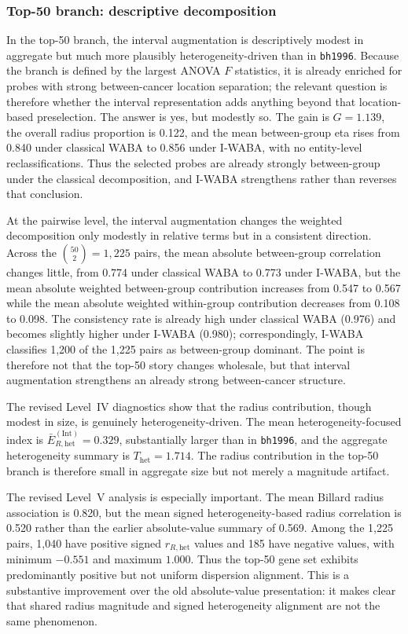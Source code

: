 \documentclass[preprint, times, 12pt, authoryear]{elsarticle}
\begin{document}
\subsubsection{Top-50 branch: descriptive decomposition}

In the top-50 branch, the interval augmentation is descriptively modest in aggregate but much more plausibly heterogeneity-driven than in \texttt{bh1996}. Because the branch is defined by the largest ANOVA $F$ statistics, it is already enriched for probes with strong between-cancer location separation; the relevant question is therefore whether the interval representation adds anything beyond that location-based preselection. The answer is yes, but modestly so. The gain is $G=1.139$, the overall radius proportion is 0.122, and the mean between-group eta rises from 0.840 under classical WABA to 0.856 under I-WABA, with no entity-level reclassifications. Thus the selected probes are already strongly between-group under the classical decomposition, and I-WABA strengthens rather than reverses that conclusion.

At the pairwise level, the interval augmentation changes the weighted decomposition only modestly in relative terms but in a consistent direction. Across the $\binom{50}{2}=1{,}225$ pairs, the mean absolute between-group correlation changes little, from 0.774 under classical WABA to 0.773 under I-WABA, but the mean absolute weighted between-group contribution increases from 0.547 to 0.567 while the mean absolute weighted within-group contribution decreases from 0.108 to 0.098. The consistency rate is already high under classical WABA (0.976) and becomes slightly higher under I-WABA (0.980); correspondingly, I-WABA classifies 1,200 of the 1,225 pairs as between-group dominant. The point is therefore not that the top-50 story changes wholesale, but that interval augmentation strengthens an already strong between-cancer structure.

The revised Level~IV diagnostics show that the radius contribution, though modest in size, is genuinely heterogeneity-driven. The mean heterogeneity-focused index is \(\bar E_{R,\mathrm{het}}^{(\mathrm{Int})}=0.329\), substantially larger than in \texttt{bh1996}, and the aggregate heterogeneity summary is \(T_{\mathrm{het}}=1.714\). The radius contribution in the top-50 branch is therefore small in aggregate size but not merely a magnitude artifact.

The revised Level~V analysis is especially important. The mean Billard radius association is 0.820, but the mean signed heterogeneity-based radius correlation is 0.520 rather than the earlier absolute-value summary of 0.569. Among the 1,225 pairs, 1,040 have positive signed \(r_{R,\mathrm{het}}\) values and 185 have negative values, with minimum \(-0.551\) and maximum \(1.000\). Thus the top-50 gene set exhibits predominantly positive but not uniform dispersion alignment. This is a substantive improvement over the old absolute-value presentation: it makes clear that shared radius magnitude and signed heterogeneity alignment are not the same phenomenon.
\end{document}
